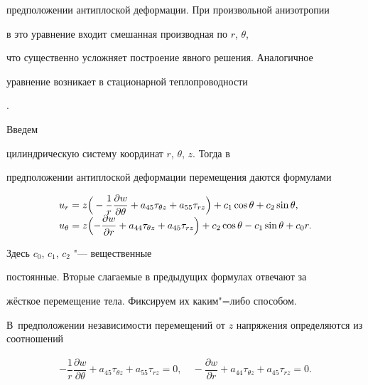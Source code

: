 предположении антиплоской деформации. При произвольной анизотропии

в это уравнение входит смешанная производная по $ r$, $\theta $,

что существенно усложняет построение явного решения. Аналогичное

уравнение возникает в стационарной теплопроводности

\cite{bogan:bib4}.



\smallskip



 Введем

цилиндрическую систему координат $ r$, $\theta$, $z$. Тогда в

предположении антиплоской деформации перемещения даются формулами

$$

\begin{array}{l}

\displaystyle u_r= z\Bigr(-\dfrac{1}{r}\dfrac{\partial w}{\partial \theta} +

a_{45} \tau_{\theta z} + a_{55} \tau_{rz} \Bigr) + c_1 \cos

\theta +c_2 \sin \theta,\\

\displaystyle u_\theta= z \Bigl( - \dfrac{\partial w}{\partial r} + a_{44}

\tau_{\theta z} + a_{45} \tau_{rz} \Bigr) + c_2 \cos \theta -c_1

\sin \theta + c_0 r.

\end{array}

$$

 Здесь $c_0$, $c_1$, $c_2$ "--- вещественные

постоянные. Вторые слагаемые в предыдущих формулах отвечают за

жёсткое перемещение тела. Фиксируем их каким"=либо способом. 

В~предположении независимости перемещений  от $z$  напряжения определяются из соотношений

\begin{gather}

\label{bogan:eq1}

- \dfrac{1}{r}\dfrac{\partial w}{\partial

\theta} + a_{45} \tau_{\theta z} + a_{55} \tau_{rz} =0,\quad 

 - \dfrac{\partial w}{\partial r} + a_{44} \tau_{\theta z} +

a_{45} \tau_{rz} =0.

\end{gather}



